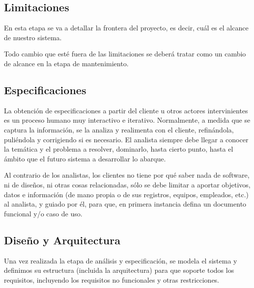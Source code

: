 \documentclass[12pt]{article}
\begin{document}
	\subsection*{Limitaciones}

	\hspace{1.27cm}En esta etapa se va a detallar la frontera del proyecto, es decir, cuál es el alcance de nuestro
	sistema.

	\hspace{1.27cm}Todo cambio que esté fuera de las limitaciones se deberá tratar como un cambio de alcance en la
	etapa de mantenimiento.

	\subsection*{Especificaciones}

	\hspace{1.27cm}La obtención de especificaciones a partir del cliente u otros actores intervinientes es un proceso humano muy interactivo e iterativo. Normalmente, a medida que se captura la información, se la analiza y realimenta con el cliente, refinándola, puliéndola y corrigiendo si es necesario. El analista siempre debe llegar a conocer la temática y el problema a resolver, dominarlo, hasta cierto punto, hasta el ámbito que el futuro sistema a desarrollar lo abarque.

	\hspace{1.27cm}Al contrario de los analistas, los clientes no tiene por qué saber nada de software, ni de diseños, ni otras cosas relacionadas, sólo se debe limitar a aportar objetivos, datos e información (de mano propia	o de sus registros, equipos, empleados, etc.) al analista, y guiado por él, para que, en primera instancia defina un documento funcional y/o caso de uso.

	\subsection*{Diseño y Arquitectura}

	\hspace{1.27cm}Una vez realizada la etapa de análisis y especificación, se modela el sistema y definimos su estructura (incluida la arquitectura) para que soporte todos los requisitos, incluyendo los requisitos no funcionales y otras restricciones.
\end{document}

